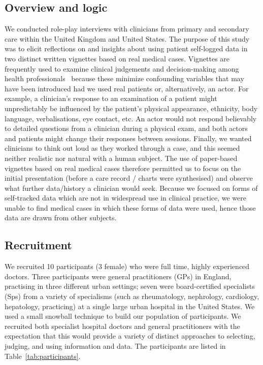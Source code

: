 \documentclass{sigchi}
\begin{document}
\subsection{Overview and logic}
We conducted role-play interviews with clinicians from primary and secondary care within the United Kingdom and United States. The purpose of this study was to elicit reflections on and insights about using patient self-logged data in two distinct written vignettes based on real medical cases.  Vignettes are frequently used to examine clinical judgements and decision-making among health professionals~\cite{evans2015vignette,redelmeier1995probability} because these minimize confounding variables that may have been introduced had we used real patients or, alternatively, an actor. For example, a clinician's response to an examination of a patient might unpredictably be influenced by the patient’s physical appearance, ethnicity, body language, verbalisations, eye contact, etc. An actor would not respond believably to detailed questions from a clinician during a physical exam, and both actors and patients might change their responses between sessions. Finally, we wanted clinicians to think out loud as they worked through a case, and this seemed neither realistic nor natural with a human subject.  The use of paper-based vignettes based on real medical cases therefore permitted us to focus on the initial presentation (before a care record / charts were synthesised) and observe what further data/history a clinician would seek. Because we focused on forms of self-tracked data which are not in widespread use in clinical practice, we were unable to find medical cases in which these forms of data were used, hence those data are drawn from other subjects. 


\subsection{Recruitment}
We recruited 10 participants (3 female) who were full time, highly experienced doctors.  Three participants were general practitioners (GPs) in England, practising in three different urban settings; seven were board-certified specialists (Sps) from a variety of specialisms (such as rheumatology, nephrology, cardiology, hepatology, practicing) at a single large urban hospital in the United States.  We used a small snowball technique to build our population of participants.   We recruited both specialist hospital doctors and general practitioners with the expectation that this would provide a variety of distinct approaches to selecting, judging, and using information and data.  The participants are listed in Table~\ref{tab:participants}.
\end{document}
